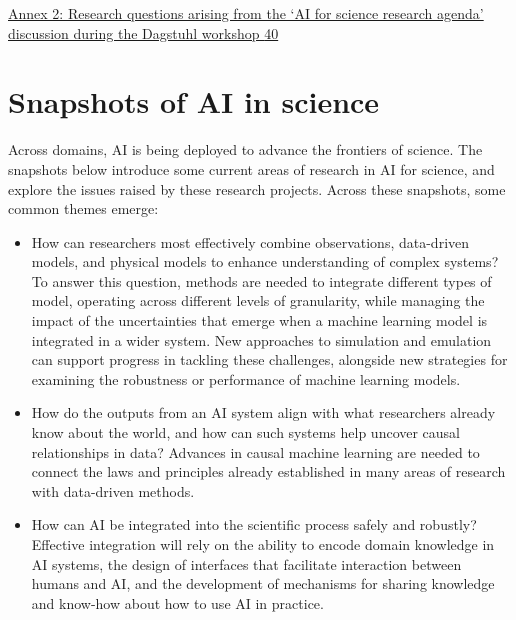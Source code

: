 \protect\hyperlink{_Toc121762051}{Annex 2: Research questions arising
from the `AI for science research agenda' discussion during the Dagstuhl
workshop \protect\hyperlink{_Toc121762051}{40}}

\hypertarget{introduction-bridging-data-driven-and-mechanistic-modelling}{%



\hypertarget{snapshots-of-ai-in-science}{%
\section{Snapshots of AI in science}\label{snapshots-of-ai-in-science}}

Across domains, AI is being deployed to advance the frontiers of
science. The snapshots below introduce some current areas of research in
AI for science, and explore the issues raised by these research
projects. Across these snapshots, some common themes emerge:

\begin{itemize}
\item
  How can researchers most effectively combine observations, data-driven
  models, and physical models to enhance understanding of complex
  systems? To answer this question, methods are needed to integrate
  different types of model, operating across different levels of
  granularity, while managing the impact of the uncertainties that
  emerge when a machine learning model is integrated in a wider system.
  New approaches to simulation and emulation can support progress in
  tackling these challenges, alongside new strategies for examining the
  robustness or performance of machine learning models.
\item
  How do the outputs from an AI system align with what researchers
  already know about the world, and how can such systems help uncover
  causal relationships in data? Advances in causal machine learning are
  needed to connect the laws and principles already established in many
  areas of research with data-driven methods.
\item
  How can AI be integrated into the scientific process safely and
  robustly? Effective integration will rely on the ability to encode
  domain knowledge in AI systems, the design of interfaces that
  facilitate interaction between humans and AI, and the development of
  mechanisms for sharing knowledge and know-how about how to use AI in
  practice.
\end{itemize}

}
